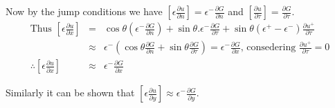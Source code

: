 Now by the jump conditions we have $ \left[\epsilon \frac{\partial u}{\partial n}\right] =\epsilon^- \frac{\partial G}{\partial n}$ and $\left[\frac{\partial u}{\partial \tau}\right]= \frac{\partial G}{\partial \tau}.$
\begin{eqnarray*}
\text{Thus } \left[\epsilon \frac{\partial u}{\partial x}\right] &=& \cos \theta (\epsilon^- \frac{\partial G}{\partial n})+\sin \theta .\epsilon^- \frac{\partial G}{\partial \tau} +\sin \theta (\epsilon^+ -\epsilon^- ) \frac{\partial u^+}{\partial \tau}\\
&\approx & \epsilon^-(\cos \theta  \frac{\partial G}{\partial n}+\sin \theta\frac{\partial G}{\partial \tau}) = \epsilon^- \frac{\partial G}{\partial x}\text{, consedering }\frac{\partial u^+}{\partial \tau}=0\\
\therefore\left[\epsilon \frac{\partial u}{\partial x}\right]&\approx &  \epsilon^- \frac{\partial G}{\partial x}
\end{eqnarray*}

Similarly it can be shown that $\left[\epsilon \frac{\partial u}{\partial y}\right] \approx   \epsilon^- \frac{\partial G}{\partial y}$. 
